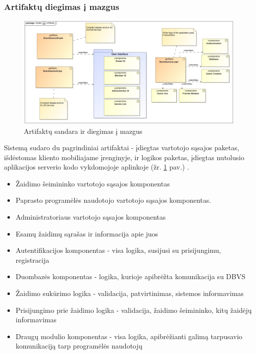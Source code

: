\documentclass{VUMIFPSkursinis}
\begin{document}
	\subsubsection{Artifaktų diegimas į mazgus}
				\begin{figure}[H]
				\centering
				\includegraphics[scale=0.4]{img/Artifacts}
				\caption{Artifaktų sandara ir diegimas į mazgus}
				\label{img:Artifacts}
			\end{figure}
			Sistemą sudaro du pagrindiniai artifaktai - įdiegtas vartotojo sąsajos 				paketas, išdėstomas kliento mobiliajame įrenginyje, ir logikos paketas, 			įdiegtas nutolusio aplikacijos serverio kodo vykdomojoje aplinkoje (žr. \ref{img:Artifacts} pav.) . 
  				\begin{itemize}
					\item Žaidimo šeimininko vartotojo sąsajos komponentas
					\item Paprasto programėlės naudotojo vartotojo sąsajos komponentas.
					\item Administratoriaus vartotojo sąsajos komponentas
					\item Esamų žaidimų sąrašas ir informacija apie juos
				\end{itemize}
  				\begin{itemize}
					\item Autentifikacijos komponentas - visa logika, susijusi 						su prisijungimu, registracija 
					\item Duombazės komponentas - logika, kurioje apibrėžta 					komunikacija su DBVS
					\item Žaidimo sukūrimo logika - validacija, patvirtinimas, 
					sistemos informavimas
					\item Prisijungimo prie žaidimo logika - validacija, 						žaidimo šeimininko, kitų žaidėjų informavimas 
					\item Draugų modulio komponentas - visa logika, 					apibrėžianti galimą tarpusavio komunikaciją tarp 						programėlės naudotojų
				\end{itemize}
\end{document}
